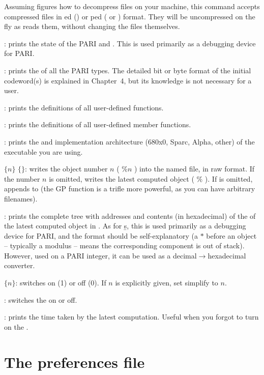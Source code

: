 Assuming  figures how to decompress files on your machine, this
command accepts compressed files in ed () or
ped ( or ) format. They will be uncompressed on
the fly as  reads them, without changing the files themselves.

: prints the state of the PARI  and .
This is used primarily as a debugging device for PARI.

: prints the  of all the PARI
types. The detailed bit or byte format of the initial codeword(s) is
explained in Chapter~4, but its knowledge is not necessary for a  user.

: prints the definitions of all user-defined functions.

: prints the definitions of all user-defined member functions.

: prints the  and implementation architecture
(680x0, Sparc, Alpha, other) of the  executable you are using.

 $\{n\}$ $\{$$\}$: writes the object number
$n$ ( $\%n$ ) into the named file, in raw format. If the number $n$ is
omitted, writes the latest computed object ( $\%$ ). If  is
omitted, appends to  (the GP function  is a trifle more
powerful, as you can have arbitrary filenames).

: prints the complete tree with addresses and contents (in
hexadecimal) of the  of the latest computed
object in . As for \b{s}, this is used primarily as a debugging device for
PARI, and the format should be self-explanatory (a $*$ before an object --
typically a modulus -- means the corresponding component is out of stack).
However, used on a PARI integer, it can be used as a
decimal$\rightarrow$hexadecimal converter.

 $\{n\}$: switches  on (1) or off (0). If $n$
is explicitly given, set simplify to $n$.

\subseckbd{\#}: switches the  on or off.

\subseckbd{\#\#}: prints the time taken by the latest computation.
Useful when you forgot to turn on the .


\section{The preferences file}
\label{se:gprc}

